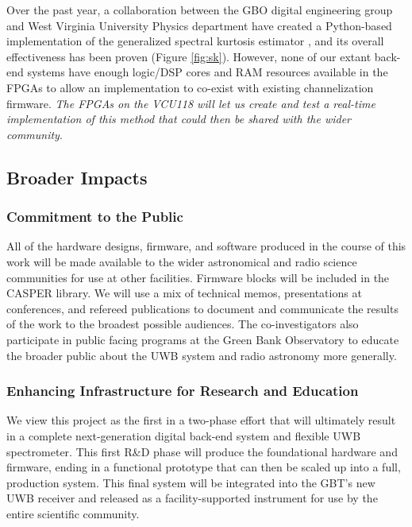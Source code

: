 \documentclass[10pt]{myNSF}
\begin{document}
Over the past year, a collaboration between the GBO digital
engineering group and West Virginia University Physics department have
created a Python-based implementation of the generalized spectral
kurtosis estimator \citep{ng10}, and its overall effectiveness has
been proven (Figure \ref{fig:sk}).  However, none of our extant
back-end systems have enough logic/DSP cores and RAM resources
available in the FPGAs to allow an implementation to co-exist with
existing channelization firmware.  \emph{The FPGAs on the VCU118 will
  let us create and test a real-time implementation of this method
  that could then be shared with the wider community}.

\subsection{Broader Impacts}
\label{sec:BI}

\subsubsection{Commitment to the Public}
\label{sec:commitment}

All of the hardware designs, firmware, and software produced in the
course of this work will be made available to the wider astronomical
and radio science communities for use at other facilities.  Firmware
blocks will be included in the CASPER library.  We will use a mix of
technical memos, presentations at conferences, and refereed
publications to document and communicate the results of the work to
the broadest possible audiences.  The co-investigators also
participate in public facing programs at the Green Bank Observatory to
educate the broader public about the UWB system and radio astronomy
more generally.

\subsubsection{Enhancing Infrastructure for Research and Education}
\label{sec:infrastructure}

\label{sec:phase_two}

We view this project as the first in a two-phase effort that will
ultimately result in a complete next-generation digital back-end
system and flexible UWB spectrometer.  This first R\&D phase will produce
the foundational hardware and firmware, ending in a functional
prototype that can then be scaled up into a full, production system.
This final system will be integrated into the GBT's new UWB receiver
and released as a facility-supported instrument for use by the entire
scientific community.
\end{document}
